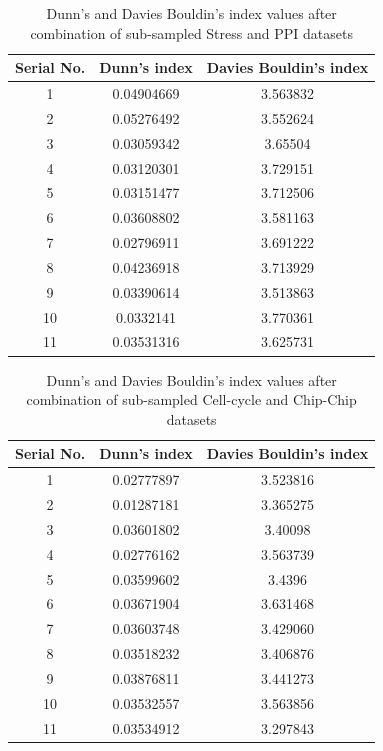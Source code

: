 \begin{table}
\centering
\begin{tabular}{|c|c|c|}
\hline
Serial No. & Dunn’s index  & Davies Bouldin’s index\\
\hline
1 & 0.04904669 & 3.563832 \\
2 & 0.05276492 & 3.552624 \\
3 & 0.03059342 & 3.65504 \\
4 & 0.03120301 & 3.729151 \\
5 & 0.03151477 & 3.712506 \\
6 & 0.03608802 & 3.581163 \\
7 & 0.02796911 & 3.691222 \\
8 & 0.04236918 & 3.713929 \\
9 & 0.03390614 & 3.513863 \\
10 & 0.0332141 & 3.770361 \\
11 & 0.03531316 & 3.625731 \\
\hline 
\end{tabular}
\caption{Dunn's and Davies Bouldin's index values after combination of sub-sampled Stress and PPI datasets}
\label{tab:stress_ppi_perturbed}
\end{table}

\begin{table}
\centering
\begin{tabular}{|c|c|c|}
\hline
Serial No. & Dunn’s index  & Davies Bouldin’s index\\
\hline
1 &  0.02777897 & 3.523816 \\
2 & 0.01287181 & 3.365275 \\
3 & 0.03601802 & 3.40098 \\
4 & 0.02776162 & 3.563739 \\
5 & 0.03599602 & 3.4396 \\
6 & 0.03671904 &  3.631468 \\
7 &  0.03603748 & 3.429060 \\
8 &  0.03518232 & 3.406876 \\
9 &  0.03876811 & 3.441273 \\
10 &  0.03532557 & 3.563856 \\
11 &  0.03534912 &  3.297843 \\
\hline 
\end{tabular}
\caption{Dunn's and Davies Bouldin's index values after combination of sub-sampled Cell-cycle and Chip-Chip datasets}
\label{tab:ccycle_chip_perturbed}
\end{table}

